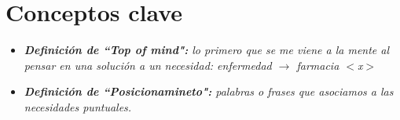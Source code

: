 \section{Conceptos clave}
\begin{itemize}
    \item \emph{\textbf{Definición de ``Top of mind":} lo primero que se me viene a la mente al pensar en una solución a un necesidad: enfermedad $\rightarrow$ farmacia $<$x$>$}
    \item \emph{\textbf{Definición de ``Posicionamineto":} palabras o frases que asociamos a las necesidades puntuales.}        
\end{itemize}
